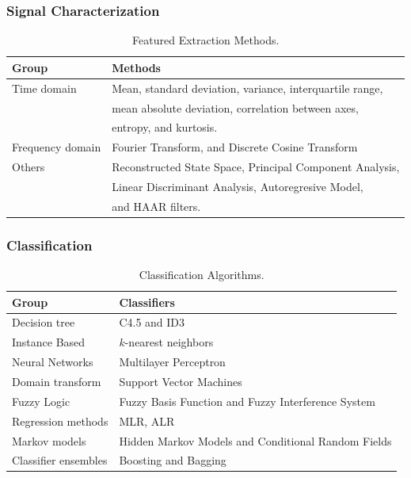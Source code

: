 \documentclass[
first,
ETH1,
navigation
]{ETHbeamerclass}
\begin{document}
\begin{frame}
\frametitle{Signal Characterization}

\begin{table}[h]
 \label{t:typesofHAR}
\scriptsize{
\begin{tabular}{|l|l |}
\hline
\textbf{Group}& \textbf{Methods} \\ \hline
Time domain & Mean, standard deviation, variance, interquartile range,\\
        & mean absolute deviation, correlation between axes,\\
        & entropy, and kurtosis. \\ \hline  
Frequency domain & Fourier Transform, and Discrete Cosine Transform \\ \hline  
Others & Reconstructed State Space, Principal Component Analysis, \\
      & Linear Discriminant Analysis, Autoregresive Model, \\
      & and HAAR filters.\\ \hline
\end{tabular}}
\caption{Featured Extraction Methods.}
\end{table}
\end{frame}



\begin{frame}
\frametitle{Classification}

\begin{table}[h]
\label{t:typesofHAR}
\scriptsize{
\begin{tabular}{|l|l |}
\hline
\textbf{Group }& \textbf{Classifiers} \\ \hline
Decision tree & C4.5 and ID3   \\ \hline  
Instance Based & $k$-nearest neighbors \\ \hline  
Neural Networks & Multilayer Perceptron \\ \hline  
Domain transform & Support Vector Machines \\ \hline  
Fuzzy Logic & Fuzzy Basis Function and Fuzzy Interference System \\ \hline  
Regression methods & MLR, ALR \\ \hline  
Markov models & Hidden Markov Models and Conditional Random Fields \\ \hline  
Classifier ensembles & Boosting and Bagging  \\ \hline  
\end{tabular}}
\caption{Classification Algorithms.}
\end{table}
\end{frame}
\end{document}
